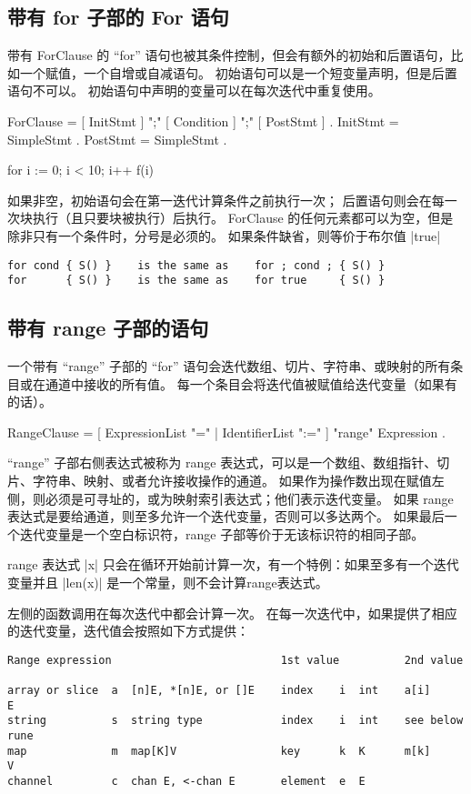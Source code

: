 \subsection{带有 for 子部的 For 语句}
带有 ForClause 的 ``for'' 语句也被其条件控制，但会有额外的初始和后置语句，比如一个赋值，一个自增或自减语句。
初始语句可以是一个短变量声明，但是后置语句不可以。
初始语句中声明的变量可以在每次迭代中重复使用。
\begin{EBNF}
ForClause = [ InitStmt ] ";" [ Condition ] ";" [ PostStmt ] .
InitStmt = SimpleStmt .
PostStmt = SimpleStmt .
\end{EBNF}




\begin{golang}
for i := 0; i < 10; i++ {
	f(i)
}
\end{golang}

如果非空，初始语句会在第一迭代计算条件之前执行一次；
后置语句则会在每一次块执行（且只要块被执行）后执行。
ForClause 的任何元素都可以为空，但是除非只有一个条件时，分号是必须的。
如果条件缺省，则等价于布尔值 \code|true|
\begin{lstlisting}
for cond { S() }    is the same as    for ; cond ; { S() }
for      { S() }    is the same as    for true     { S() }
\end{lstlisting}

\subsection{带有 range 子部的语句}
一个带有 ``range'' 子部的 ``for'' 语句会迭代数组、切片、字符串、或映射的所有条目或在通道中接收的所有值。
每一个条目会将迭代值被赋值给迭代变量（如果有的话）。
\begin{EBNF}
RangeClause = [ ExpressionList "=" | IdentifierList ":=" ] "range" Expression .
\end{EBNF}

``range'' 子部右侧表达式被称为 range 表达式，可以是一个数组、数组指针、切片、字符串、映射、或者允许接收操作的通道。
如果作为操作数出现在赋值左侧，则必须是可寻址的，或为映射索引表达式；他们表示迭代变量。
如果 range 表达式是要给通道，则至多允许一个迭代变量，否则可以多达两个。
如果最后一个迭代变量是一个空白标识符，range 子部等价于无该标识符的相同子部。

range 表达式 \code|x| 只会在循环开始前计算一次，有一个特例：如果至多有一个迭代变量并且 \code|len(x)| 是一个常量，则不会计算range表达式。

左侧的函数调用在每次迭代中都会计算一次。
在每一次迭代中，如果提供了相应的迭代变量，迭代值会按照如下方式提供：
\begin{lstlisting}
Range expression                          1st value          2nd value

array or slice  a  [n]E, *[n]E, or []E    index    i  int    a[i]       E
string          s  string type            index    i  int    see below  rune
map             m  map[K]V                key      k  K      m[k]       V
channel         c  chan E, <-chan E       element  e  E
\end{lstlisting}

